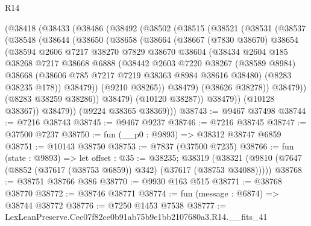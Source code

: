 \begin{lexlean}{R14}
\begin{coremodule}
    (@38418
      (@38433
        (@38486
          (@38492
            (@38502
              (@38515
                (@38521
                  (@38531
                    (@38537
                      (@38548
                        (@38644
                          (@38650
                            (@38658
                              (@38664
                                (@38667
                                  (@7830 @38670)
                                  @38654
                                  (@38594
                                    @2606
                                    @7217
                                    @38270
                                    @7829
                                    @38670
                                    @38604
                                    (@38434
                                      @2604
                                      @185
                                      @38268
                                      @7217
                                      @38668
                                      @6888
                                      (@38442
                                        @2603
                                        @7220
                                        @38267
                                        (@38589 @8984)
                                        @38668
                                        (@38606 @785 @7217 @7219 @38363 @8984 @38616 @38480)
                                        (@8283 @38235 @178))
                                      @38479))
                                  (@9210 @38265))
                                @38479)
                              (@38626 @38278))
                            @38479))
                        (@8283 @38259 @38286))
                      @38479)
                    (@10120 @38287))
                  @38479))
              (@10128 @38367))
            @38479))
        (@9224 @38365 @38369)))
@38743 := @9467 @37498
@38744 := @7216 @38743
@38745 := @9467 @9237
@38746 := @7216 @38745
@38747 := @37500 @7237
@38750 := fun (__p0 : @9893) => @38312 @38747 @6859
@38751 := @10143 @38750
@38753 := @7837 (@37500 @7235)
@38766 := fun (state : @9893) =>
  let offset : @35 := @38235;
  @38319 (@38321 (@9810 (@7647 (@8852 (@37617 (@38753 @6859)) @342) (@37617 (@38753 @34088)))))
@38768 := @38751 @38766 @386
@38770 := @9930 @163 @515
@38771 := @38768 @38770
@38772 := @38746 @38771
@38774 := fun (message : @6874) => @38744 @38772
@38776 := @7250 @1453 @7538
@38777 := LexLeanPreserve.Cec07f82ce0b91ab75b9e1bb2107680a3.R14.__fits_41

\end{coremodule}
\end{lexlean}
